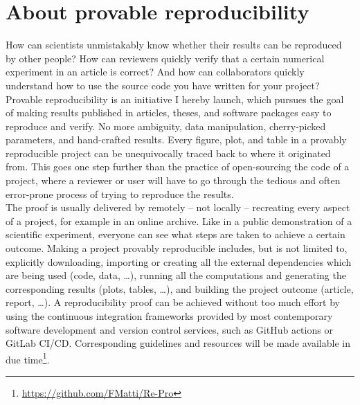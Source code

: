 \chapter*{About provable reproducibility}
\label{chp:0-reproducibility}

How can scientists unmistakably know whether their results can be reproduced
by other people? How can reviewers quickly verify that a certain numerical
experiment in an article is correct? And how can collaborators quickly
understand how to use the source code you have written for your project?\\

Provable reproducibility is an initiative I hereby launch, which pursues the
goal of making results published in articles, theses, and software packages easy to
reproduce and verify. No more ambiguity, data manipulation, cherry-picked
parameters, and hand-crafted results. Every figure, plot, and table
in a provably reproducible project can be unequivocally traced back to where
it originated from. This goes one step further than the practice of open-sourcing
the code of a project, where a reviewer or user will have to go through the
tedious and often error-prone process of trying to reproduce the results.\\

The proof is usually delivered by remotely -- not locally -- recreating every aspect of a
project, for example in an online archive. Like in a public demonstration of a scientific
experiment, everyone can see what steps are taken to achieve a certain outcome.
Making a project provably reproducible includes, but is not limited to,
explicitly downloading, importing or creating all the external dependencies which are being used (code, data, \dots),
running all the computations and generating the corresponding results (plots, tables, \dots),
and building the project outcome (article, report, \dots).
A reproducibility proof can be achieved without too much effort by
using the continuous integration frameworks provided by most contemporary
software development and version control services, such as GitHub actions or
GitLab CI/CD. Corresponding guidelines and resources will be made available in due
time\footnote{\url{https://github.com/FMatti/Re-Pro}}.

